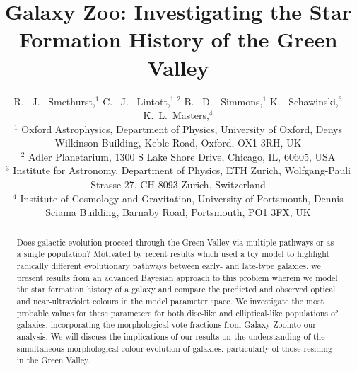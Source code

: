 \documentclass{mn2e}
\begin{document}
\title[The Star Fomation History of the Green Valley]{Galaxy Zoo: Investigating the Star Formation History of the Green Valley}
\author[Smethurst et al. 2014]{R. ~J. ~Smethurst,$^1$ C. ~J. ~Lintott,$^{1,2}$ B. ~D. ~Simmons,$^{1}$ K. ~Schawinski,$^{3}$ K.~L.~Masters,$^{4}$ 
\\ $^1$ Oxford Astrophysics, Department of Physics, University of Oxford, Denys Wilkinson Building, Keble Road, Oxford, OX1 3RH, UK 
\\ $^2$ Adler Planetarium, 1300 S Lake Shore Drive, Chicago, IL, 60605, USA 
\\ $^3$ Institute for Astronomy, Department of Physics, ETH Zurich, Wolfgang-Pauli Strasse 27, CH-8093 Zurich, Switzerland 
\\ $^4$ Institute of Cosmology and Gravitation, University of Portsmouth, Dennis Sciama Building, Barnaby Road, Portsmouth, PO1 3FX, UK }

\maketitle

\begin{abstract}
Does galactic evolution proceed through the Green Valley via multiple pathways or as a single population? Motivated by recent results which used a toy model to highlight radically different evolutionary pathways between early- and late-type galaxies, we present results from an advanced Bayesian approach to this problem wherein we model the star formation history of a galaxy and compare the predicted and observed optical and near-ultraviolet colours in the model parameter space. We investigate the most probable values for these parameters for both disc-like and elliptical-like populations of galaxies, incorporating the morphological vote fractions from Galaxy Zoo\footnotemark[1] into our analysis. We will discuss the implications of our results on the understanding of the simultaneous morphological-colour evolution of galaxies, particularly of those residing in the Green Valley. 
\end{abstract}

\\
\end{document}

